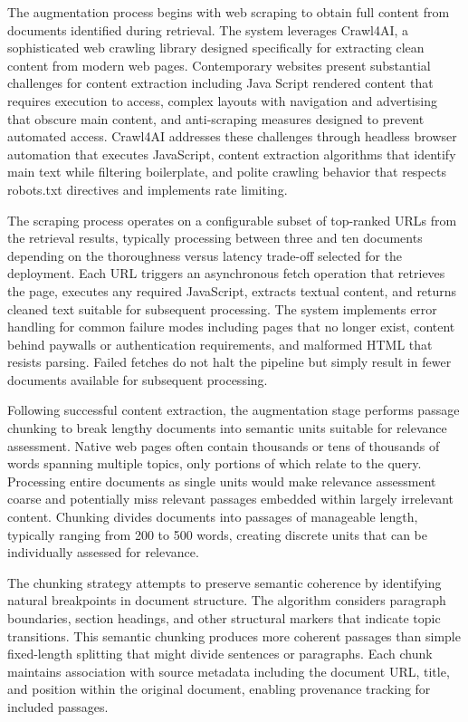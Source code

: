 The augmentation process begins with web scraping to obtain full content from documents identified during retrieval. The system leverages Crawl4AI, a sophisticated web crawling library designed specifically for extracting clean content from modern web pages. Contemporary websites present substantial challenges for content extraction including Java  Script rendered content that requires execution to access, complex layouts with navigation and advertising that obscure main content, and anti-scraping measures designed to prevent automated access. Crawl4AI addresses these challenges through headless browser automation that executes JavaScript, content extraction algorithms that identify main text while filtering boilerplate, and polite crawling behavior that respects robots.txt directives and implements rate limiting.

The scraping process operates on a configurable subset of top-ranked URLs from the retrieval results, typically processing between three and ten documents depending on the thoroughness versus latency trade-off selected for the deployment. Each URL triggers an asynchronous fetch operation that retrieves the page, executes any required JavaScript, extracts textual content, and returns cleaned text suitable for subsequent processing. The system implements error handling for common failure modes including pages that no longer exist, content behind paywalls or authentication requirements, and malformed HTML that resists parsing. Failed fetches do not halt the pipeline but simply result in fewer documents available for subsequent processing.

Following successful content extraction, the augmentation stage performs passage chunking to break lengthy documents into semantic units suitable for relevance assessment. Native web pages often contain thousands or tens of thousands of words spanning multiple topics, only portions of which relate to the query. Processing entire documents as single units would make relevance assessment coarse and potentially miss relevant passages embedded within largely irrelevant content. Chunking divides documents into passages of manageable length, typically ranging from 200 to 500 words, creating discrete units that can be individually assessed for relevance.

The chunking strategy attempts to preserve semantic coherence by identifying natural breakpoints in document structure. The algorithm considers paragraph boundaries, section headings, and other structural markers that indicate topic transitions. This semantic chunking produces more coherent passages than simple fixed-length splitting that might divide sentences or paragraphs. Each chunk maintains association with source metadata including the document URL, title, and position within the original document, enabling provenance tracking for included passages.

